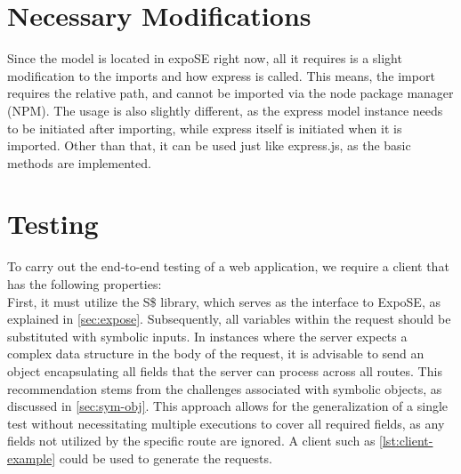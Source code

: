 \section{Necessary Modifications} 
\label{sec:nec-mods}

Since the model is located in expoSE right now, all it requires is a slight modification to the imports and how express is called.
This means, the import requires the relative path, and cannot be imported via the node package manager (NPM). 
The usage is also slightly different, as the express model instance needs to be initiated after importing, while express itself is initiated when it is imported. 
Other than that, it can be used just like express.js, as the basic methods are implemented.





\section{Testing} 
\label{sec:app-testing}
To carry out the end-to-end testing of a web application, we require a client that has the following properties:\\ 
First, it must utilize the S\$ library, which serves as the interface to ExpoSE, as explained in \autoref{sec:expose}. 
Subsequently, all variables within the request should be substituted with symbolic inputs. 
In instances where the server expects a complex data structure in the body of the request,
it is advisable to send an object encapsulating all fields that the server can process across all routes.
This recommendation stems from the challenges associated with symbolic objects, as discussed in \autoref{sec:sym-obj}. 
This approach allows for the generalization of a single test without necessitating multiple executions to cover all required fields,
as any fields not utilized by the specific route are ignored. 
A client such as  \autoref{lst:client-example} could be used to generate the requests.

